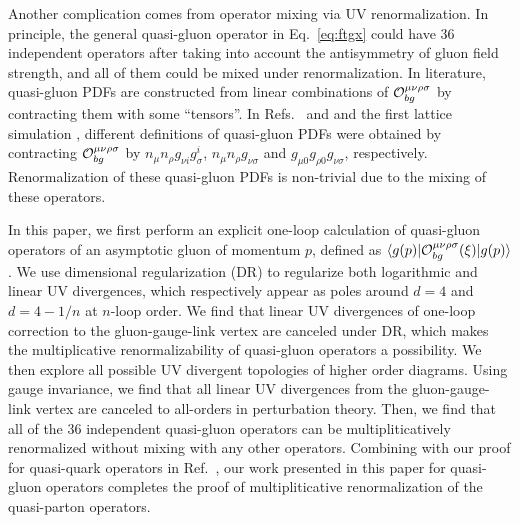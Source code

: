 Another complication comes from operator mixing via UV renormalization. In principle, the general quasi-gluon operator in Eq.~\eqref{eq:ftgx} could have 36 independent operators after taking into account the antisymmetry of gluon field strength, and all of them could be mixed under renormalization.  In literature, quasi-gluon PDFs are constructed from linear combinations of ${\cal O}_{bg}^{\mu \nu \rho\sigma}$ by contracting them with some ``tensors''. In Refs.~\cite{Ji:2013dva} and \cite{Wang:2017eel} and the first lattice simulation \cite{Fan:2018dxu}, different definitions of quasi-gluon PDFs were obtained by contracting ${\cal O}_{bg}^{\mu \nu \rho\sigma}$ by $n_\mu n_\rho  g_{\nu i}g_\sigma^{i}$, $n_\mu n_\rho  g_{\nu \sigma}$ and $g_{\mu 0}g_{\rho0}  g_{\nu \sigma}$, respectively. Renormalization of these quasi-gluon PDFs is non-trivial due to the mixing of these operators.

In this paper, we first perform an explicit one-loop calculation of quasi-gluon operators of an asymptotic gluon of momentum $p$, defined as $\langle g(p)|{\cal O}_{bg}^{\mu \nu \rho\sigma}(\xi) | g(p) \rangle$.  We use dimensional regularization (DR) to regularize both logarithmic and linear UV divergences, which respectively appear as poles around $d=4$ and $d=4-1/n$ at $n$-loop order. We find that linear UV divergences of one-loop correction to the gluon-gauge-link vertex are canceled under DR, which makes the multiplicative renormalizability of quasi-gluon operators a possibility. We then explore all possible UV divergent topologies of higher order diagrams.  Using gauge invariance, we find that all linear UV divergences from the gluon-gauge-link vertex are canceled to all-orders in perturbation theory.
Then, we find that all of the 36 independent quasi-gluon operators can be multipliticatively renormalized without mixing with any other operators. Combining with our proof for quasi-quark operators in Ref.~\cite{Ishikawa:2017faj}, our work presented in this paper for quasi-gluon operators completes the proof of multipliticative renormalization of the quasi-parton operators.
